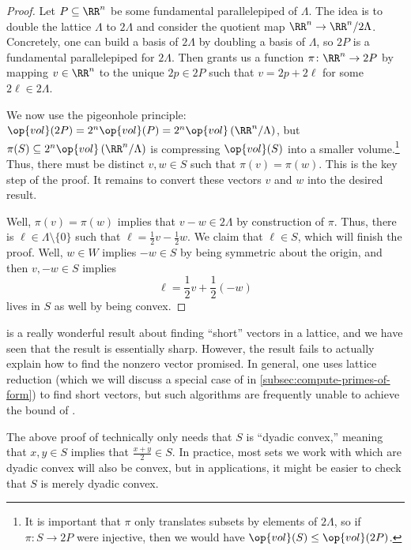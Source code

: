 \documentclass[../notes.tex]{subfiles}
\begin{document}
\begin{proof}
	Let $P\subseteq\RR^n$ be some fundamental parallelepiped of $\Lambda$. The idea is to double the lattice $\Lambda$ to $2\Lambda$ and consider the quotient map $\RR^n\to\RR^n/2\Lambda$. Concretely, one can build a basis of $2\Lambda$ by doubling a basis of $\Lambda$, so $2P$ is a fundamental parallelepiped for $2\Lambda$. Then  grants us a function $\pi\colon\RR^n\to2P$ by mapping $v\in\RR^n$ to the unique $2p\in2P$ such that $v=2p+2\ell$ for some $2\ell\in2\Lambda$.

	We now use the pigeonhole principle: $\op{vol}(2P)=2^n\op{vol}(P)=2^n\op{vol}\left(\RR^n/\Lambda\right)$, but $\pi(S)\subseteq2^n\op{vol}\left(\RR^n/\Lambda\right)$ is compressing $\op{vol}(S)$ into a smaller volume.\footnote{It is important that $\pi$ only translates subsets by elements of $2\Lambda$, so if $\pi\colon S\to2P$ were injective, then we would have $\op{vol}(S)\le\op{vol}(2P)$.} Thus, there must be distinct $v,w\in S$ such that $\pi(v)=\pi(w)$. This is the key step of the proof. It remains to convert these vectors $v$ and $w$ into the desired result.

	Well, $\pi(v)=\pi(w)$ implies that $v-w\in2\Lambda$ by construction of $\pi$. Thus, there is $\ell\in\Lambda\setminus\{0\}$ such that $\ell=\frac12v-\frac12w$. We claim that $\ell\in S$, which will finish the proof. Well, $w\in W$ implies $-w\in S$ by being symmetric about the origin, and then $v,-w\in S$ implies
	\[\ell=\frac12v+\frac12(-w)\]
	lives in $S$ as well by being convex.
\end{proof}
\begin{remark}
	 is a really wonderful result about finding ``short'' vectors in a lattice, and we have seen that the result is essentially sharp. However, the result fails to actually explain how to find the nonzero vector promised. In general, one uses lattice reduction (which we will discuss a special case of in \cref{subsec:compute-primes-of-form}) to find short vectors, but such algorithms are frequently unable to achieve the bound of .
\end{remark}
\begin{remark}
	The above proof of  technically only needs that $S$ is ``dyadic convex,'' meaning that $x,y\in S$ implies that $\frac{x+y}2\in S$. In practice, most sets we work with which are dyadic convex will also be convex, but in applications, it might be easier to check that $S$ is merely dyadic convex.
\end{remark}
\end{document}
